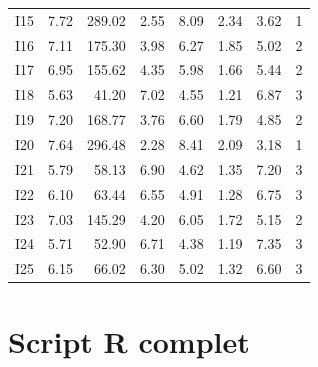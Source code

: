\documentclass[11pt,a4paper,oneside]{book}
\begin{document}
\begin{longtable}{@{}lrrrrrrc@{}}
I15 & 7.72 & 289.02 & 2.55 & 8.09 & 2.34 & 3.62 & 1 \\
I16 & 7.11 & 175.30 & 3.98 & 6.27 & 1.85 & 5.02 & 2 \\
I17 & 6.95 & 155.62 & 4.35 & 5.98 & 1.66 & 5.44 & 2 \\
I18 & 5.63 & 41.20  & 7.02 & 4.55 & 1.21 & 6.87 & 3 \\
I19 & 7.20 & 168.77 & 3.76 & 6.60 & 1.79 & 4.85 & 2 \\
I20 & 7.64 & 296.48 & 2.28 & 8.41 & 2.09 & 3.18 & 1 \\
I21 & 5.79 & 58.13  & 6.90 & 4.62 & 1.35 & 7.20 & 3 \\
I22 & 6.10 & 63.44  & 6.55 & 4.91 & 1.28 & 6.75 & 3 \\
I23 & 7.03 & 145.29 & 4.20 & 6.05 & 1.72 & 5.15 & 2 \\
I24 & 5.71 & 52.90  & 6.71 & 4.38 & 1.19 & 7.35 & 3 \\
I25 & 6.15 & 66.02  & 6.30 & 5.02 & 1.32 & 6.60 & 3 \\
\end{longtable}

\chapter{Script R complet}
\end{document}
